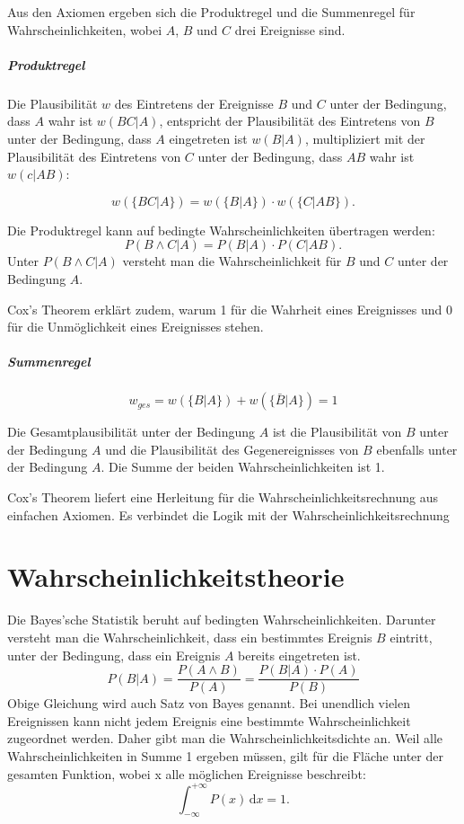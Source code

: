 \documentclass[]{dsadokumentation}
\begin{document}
Aus den Axiomen ergeben sich die Produktregel und die Summenregel für Wahrscheinlichkeiten, wobei $A$, $B$ und $C$ drei Ereignisse sind.

\subparagraph{Produktregel}

Die Plausibilität $w$ des Eintretens der Ereignisse $B$ und $C$ unter der Bedingung, dass $A$ wahr ist $w(BC|A)$,
entspricht der Plausibilität des Eintretens von $B$ unter der Bedingung, dass $A$ eingetreten ist $w(B|A)$,
multipliziert mit der Plausibilität des Eintretens von $C$ unter der Bedingung, dass $AB$ wahr ist $w(c|AB)$:

\begin {equation}
w(\{BC|A\})=w(\{B|A\})\cdot w(\{C|AB\}) .
\end{equation}

\noindent Die Produktregel kann auf bedingte Wahrscheinlichkeiten übertragen werden:
\begin {equation}
P(B \wedge C|A) = P(B|A)\cdot P(C|AB).
\end{equation}
Unter $P(B \wedge C|A)$ versteht man die Wahrscheinlichkeit für $B$ und $C$ unter der Bedingung $A$.

Cox's Theorem erklärt zudem, warum 1 für die Wahrheit eines Ereignisses und 0 für die Unmöglichkeit eines Ereignisses stehen.

\subparagraph{Summenregel}
\begin{equation}
  w_{ges}=w(\{B|A\}) + w(\{\bar{B}|A\})= 1
\end{equation}

Die Gesamtplausibilität unter der Bedingung $A$ ist die Plausibilität von $B$ unter der Bedingung $A$
und die Plausibilität des Gegenereignisses von $B$ ebenfalls unter der Bedingung $A$. Die Summe der beiden Wahrscheinlichkeiten ist 1.


Cox's Theorem liefert eine Herleitung für die Wahrscheinlichkeitsrechnung aus einfachen Axiomen. Es verbindet die Logik mit der Wahrscheinlichkeitsrechnung

\section{Wahrscheinlichkeitstheorie}

Die Bayes'sche Statistik beruht auf bedingten Wahrscheinlichkeiten. Darunter versteht man die Wahrscheinlichkeit, dass ein bestimmtes Ereignis $B$ eintritt, unter der Bedingung, dass ein Ereignis $A$ bereits eingetreten ist.
\begin{equation}
  P(B|A) = \frac{P(A \wedge B)}{P(A)} = \frac{P(B|A)\cdot P(A)}{P(B)}
\end{equation}
Obige Gleichung wird auch Satz von Bayes genannt. Bei unendlich vielen Ereignissen kann nicht jedem Ereignis eine bestimmte Wahrscheinlichkeit zugeordnet werden. Daher gibt man die Wahrscheinlichkeitsdichte an. Weil alle Wahrscheinlichkeiten in Summe 1 ergeben müssen, gilt für die Fläche unter der gesamten Funktion, wobei x alle möglichen Ereignisse beschreibt:
\begin{equation}
  \int_{- \infty }^ {+ \infty} P(x) \,\mbox{d}x = 1.
\end{equation}
\end{document}
